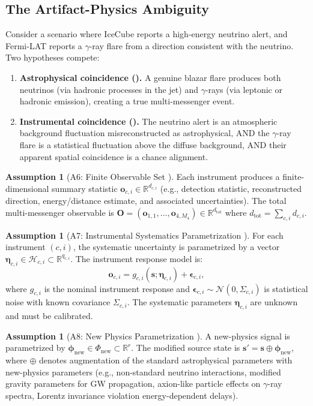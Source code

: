 \documentclass[11pt,a4paper]{article}
\theoremstyle{definition}
\newtheorem{assumption}[theorem]{Assumption}
\newcommand{\R}{\mathbb{R}}
\newcommand{\cN}{\mathcal{N}}
\begin{document}
\subsection{The Artifact-Physics Ambiguity}
Consider a scenario where IceCube reports a high-energy neutrino alert, and Fermi-LAT reports a $\gamma$-ray flare from a direction consistent with the neutrino. Two hypotheses compete:
\begin{enumerate}[label=H\arabic*:, leftmargin=*]
    \item \textbf{Astrophysical coincidence ().} A genuine blazar flare produces both neutrinos (via hadronic processes in the jet) and $\gamma$-rays (via leptonic or hadronic emission), creating a true multi-messenger event.
    \item \textbf{Instrumental coincidence ().} The neutrino alert is an atmospheric background fluctuation misreconstructed as astrophysical, AND the $\gamma$-ray flare is a statistical fluctuation above the diffuse background, AND their apparent spatial coincidence is a chance alignment.
\end{enumerate}
\begin{assumption}[A6: Finite Observable Set ]\label{ass:A6}
Each instrument produces a finite-dimensional summary statistic $\mathbf{o}_{c,i} \in \R^{d_{c,i}}$ (e.g., detection statistic, reconstructed direction, energy/distance estimate, and associated uncertainties). The total multi-messenger observable is $\mathbf{O} = (\mathbf{o}_{1,1}, \ldots, \mathbf{o}_{4, M_4}) \in \R^{d_{\mathrm{tot}}}$ where $d_{\mathrm{tot}} = \sum_{c,i} d_{c,i}$.
\end{assumption}
\begin{assumption}[A7: Instrumental Systematics Parametrization ]\label{ass:A7}
For each instrument $(c,i)$, the systematic uncertainty is parametrized by a vector $\boldsymbol{\eta}_{c,i} \in \mathcal{H}_{c,i} \subset \R^{q_{c,i}}$. The instrument response model is:
\begin{equation}\label{eq:systematics_model}
\mathbf{o}_{c,i} = g_{c,i}(\mathbf{s}; \boldsymbol{\eta}_{c,i}) + \boldsymbol{\epsilon}_{c,i},
\end{equation}
where $g_{c,i}$ is the nominal instrument response and $\boldsymbol{\epsilon}_{c,i} \sim \cN(0, \Sigma_{c,i})$ is statistical noise with known covariance $\Sigma_{c,i}$. The systematic parameters $\boldsymbol{\eta}_{c,i}$ are unknown and must be calibrated.
\end{assumption}
\begin{assumption}[A8: New Physics Parametrization ]\label{ass:A8}
A new-physics signal is parametrized by $\boldsymbol{\phi}_{\mathrm{new}} \in \Phi_{\mathrm{new}} \subset \R^{r}$. The modified source state is $\mathbf{s}' = \mathbf{s} \oplus \boldsymbol{\phi}_{\mathrm{new}}$, where $\oplus$ denotes augmentation of the standard astrophysical parameters with new-physics parameters (e.g., non-standard neutrino interactions, modified gravity parameters for GW propagation, axion-like particle effects on $\gamma$-ray spectra, Lorentz invariance violation energy-dependent delays).
\end{assumption}
\end{document}
